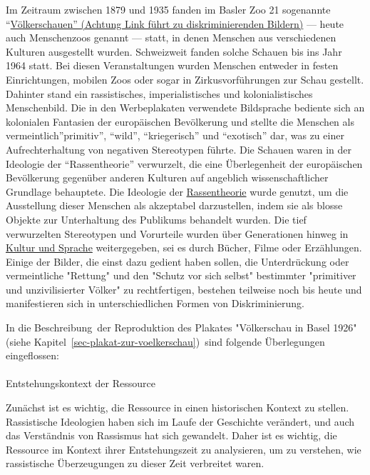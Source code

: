 \documentclass[
  nswissgerman,
  letterpaper,
  DIV=11,
  numbers=noendperiod]{scrartcl}
\makeatletter
\let\oldparagraph\paragraph
\renewcommand{\paragraph}{
    \@ifstar
      \xxxParagraphStar
      \xxxParagraphNoStar
  }
\newcommand{\xxxParagraphStar}[1]{\oldparagraph*{#1}\mbox{}}
\newcommand{\xxxParagraphNoStar}[1]{\oldparagraph{#1}\mbox{}}
\makeatother
\begin{document}
Im Zeitraum zwischen 1879 und 1935 fanden im Basler Zoo 21 sogenannte
``\href{https://www.baslerstadtbuch.ch/stadtbuch/1992/1992_2247.html}{Völkerschauen''
(Achtung Link führt zu diskriminierenden Bildern)} --- heute auch
Menschenzoos genannt --- statt, in denen Menschen aus verschiedenen
Kulturen ausgestellt wurden. Schweizweit fanden solche Schauen bis ins
Jahr 1964 statt. Bei diesen Veranstaltungen wurden Menschen entweder in
festen Einrichtungen, mobilen Zoos oder sogar in Zirkusvorführungen zur
Schau gestellt. Dahinter stand ein rassistisches, imperialistisches und
kolonialistisches Menschenbild. Die in den Werbeplakaten verwendete
Bildsprache bediente sich an kolonialen Fantasien der europäischen
Bevölkerung und stellte die Menschen als vermeintlich''primitiv'',
``wild'', ``kriegerisch'' und ``exotisch'' dar, was zu einer
Aufrechterhaltung von negativen Stereotypen führte. Die Schauen waren in
der Ideologie der ``Rassentheorie'' verwurzelt, die eine Überlegenheit
der europäischen Bevölkerung gegenüber anderen Kulturen auf angeblich
wissenschaftlicher Grundlage behauptete. Die Ideologie der
\href{https://hls-dhs-dss.ch/de/articles/060537/2024-04-08/}{Rassentheorie}
wurde genutzt, um die Ausstellung dieser Menschen als akzeptabel
darzustellen, indem sie als blosse Objekte zur Unterhaltung des
Publikums behandelt wurden. Die tief verwurzelten Stereotypen und
Vorurteile wurden über Generationen hinweg in
\href{https://mirsindvoda.ch/voelkerschauen-in-der-schweiz/}{Kultur und
Sprache} weitergegeben, sei es durch Bücher, Filme oder Erzählungen.
Einige der Bilder, die einst dazu gedient haben sollen, die
Unterdrückung oder vermeintliche "Rettung" und den "Schutz vor sich
selbst" bestimmter "primitiver und unzivilisierter Völker" zu
rechtfertigen, bestehen teilweise noch bis heute und manifestieren sich
in unterschiedlichen Formen von Diskriminierung.

In die Beschreibung~der Reproduktion des Plakates "Völkerschau in Basel
1926" (siehe Kapitel~\ref{sec-plakat-zur-voelkerschau})~sind folgende
Überlegungen eingeflossen:

\paragraph{Entstehungskontext der
Ressource}\label{entstehungskontext-der-ressource}

Zunächst ist es wichtig, die Ressource in einen historischen Kontext zu
stellen. Rassistische Ideologien haben sich im Laufe der Geschichte
verändert, und auch das Verständnis von Rassismus hat sich gewandelt.
Daher ist es wichtig, die Ressource im Kontext ihrer Entstehungszeit zu
analysieren, um zu verstehen, wie rassistische Überzeugungen zu dieser
Zeit verbreitet waren.
\end{document}
